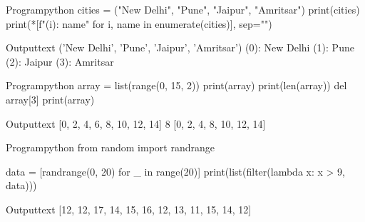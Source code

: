 \documentclass[11pt]{ipu-python}
\begin{document}
    \begin{code}
        {Program}{python}
cities = ("New Delhi", "Pune", "Jaipur", "Amritsar")
print(cities)
print(*[f"({i}): {name}" for i, name in enumerate(cities)], sep="\n")
    \end{code}
    \begin{code}
        {Output}{text}
('New Delhi', 'Pune', 'Jaipur', 'Amritsar')
(0): New Delhi
(1): Pune
(2): Jaipur
(3): Amritsar
    \end{code}

    \begin{code}
        {Program}{python}
array = list(range(0, 15, 2))
print(array)
print(len(array))
del array[3]
print(array)
    \end{code}
    \begin{code}
        {Output}{text}
[0, 2, 4, 6, 8, 10, 12, 14]
8
[0, 2, 4, 8, 10, 12, 14]
    \end{code}

    \begin{code}
        {Program}{python}
from random import randrange

data = [randrange(0, 20) for _ in range(20)]
print(list(filter(lambda x: x > 9, data)))
    \end{code}
    \newpage
    \begin{code}
        {Output}{text}
[12, 12, 17, 14, 15, 16, 12, 13, 11, 15, 14, 12]
    \end{code}
\end{document}
